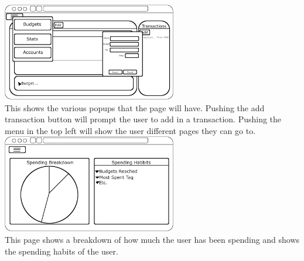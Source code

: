 \documentclass[12pt]{article}
\begin{document}
\includegraphics[width=3in]{BudgetPageWithMenu.png}\\
This shows the various popups that the page will have. Pushing the add transaction button will prompt the user to add in a transaction. Pushing the menu in the top left will show the user different pages they can go to.\\

\includegraphics[width=3in]{StatsPage.png}\\
This page shows a breakdown of how much the user has been spending and shows the spending habits of the user.\\
\end{document}
